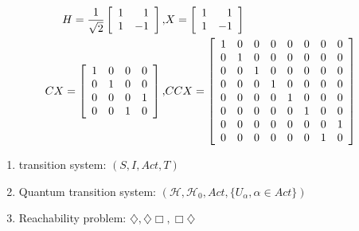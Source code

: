 \documentclass[aspectratio=1610,18pt]{ctexbeamer}
\begin{document}
\begin{frame}
  \begin{align}
    H=\frac{1}{\sqrt{2}}\left[\begin{array}{rr}
    1 & 1 \\
    1 & -1
    \end{array}\right],&
    X=\left[\begin{array}{rr}
      1 & 1 \\
      1 & -1
      \end{array}\right]
    \\\notag
    CX=\left[\begin{array}{llll}
    1 & 0 & 0 & 0 \\
    0 & 1 & 0 & 0 \\
    0 & 0 & 0 & 1 \\
    0 & 0 & 1 & 0
    \end{array}\right],&CCX=\left[\begin{array}{llllllll}
      1 & 0 & 0 & 0 & 0 & 0 & 0 & 0 \\
      0 & 1 & 0 & 0 & 0 & 0 & 0 & 0 \\
      0 & 0 & 1 & 0 & 0 & 0 & 0 & 0 \\
      0 & 0 & 0 & 1 & 0 & 0 & 0 & 0 \\
      0 & 0 & 0 & 0 & 1 & 0 & 0 & 0 \\
      0 & 0 & 0 & 0 & 0 & 1 & 0 & 0 \\
      0 & 0 & 0 & 0 & 0 & 0 & 0 & 1 \\
      0 & 0 & 0 & 0 & 0 & 0 & 1 & 0
      \end{array}\right]\notag
  \end{align}
\end{frame}
\begin{frame}
  \begin{enumerate}
    \Large
    \item  transition system: $(S, I, Act, T)$
    \item Quantum transition system: $(\mathcal{H}, \mathcal{H}_0, Act, \{U_\alpha,\alpha\in Act\})$
    \item Reachability problem: $\diamondsuit,\diamondsuit\Box,\Box\diamondsuit $
  \end{enumerate}
\end{frame}
\end{document}
